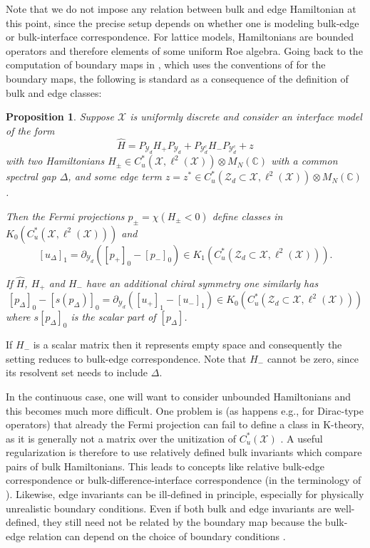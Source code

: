\documentclass[12pt]{amsart}
\newtheorem{proposition}[theorem]{Proposition}
\newcommand{\CM}{{\mathbb C}}
\newcommand{\Xx}{{\mathcal X}}
\newcommand{\Yy}{{\mathcal Y}}
\newcommand{\Zz}{{\mathcal Z}}
\newcommand{\pdv}{\partial}
\begin{document}
Note that we do not impose any relation between bulk and edge Hamiltonian at this point, since the precise setup depends on whether one is modeling bulk-edge or bulk-interface correspondence.
For lattice models, Hamiltonians are bounded operators and therefore elements of some uniform Roe algebra. Going back to the computation of boundary maps in \cite{ProdanSchulzBaldes2016}, which uses the conventions of \cite{RordamLarsenLaustsen2000} for the boundary maps, the following is standard as a consequence of the definition of bulk and edge classes:
\begin{proposition}
\label{prop:boundary_maps}
Suppose $\Xx$ is uniformly discrete and consider an interface model of the form
$$\hat{H}= P_{\Yy_d} H_+ P_{\Yy_d}  +  P_{\Yy^c_d} H_- P_{\Yy^c_d} + z$$
with two Hamiltonians $H_\pm \in C^*_u(\Xx,\ell^2(\Xx))\otimes M_N(\CM)$ with a common spectral gap $\Delta$, and some edge term $z=z^*\in C^*_u(\Zz_d\subset \Xx, \ell^2(\Xx))\otimes M_N(\CM)$.

Then the Fermi projections $p_\pm = \chi(H_\pm<0)$ define classes in $K_0(C^*_u(\Xx,\ell^2(\Xx)))$ and 
$$[u_\Delta]_1 = \pdv_{\Yy_d} \left( [p_+]_0- [p_-]_0\right) \in K_1(C^*_u(\Zz_d\subset \Xx, \ell^2(\Xx))).$$

If $\hat{H}$, $H_+$ and $H_-$ have an additional chiral symmetry one similarly has
\[[p_\Delta]_0-[s(p_\Delta)]_0 = \pdv_{\Yy_d} \left( [u_+]_1- [u_-]_1\right) \in K_0(C^*_u(\Zz_d\subset \Xx, \ell^2(\Xx)))\]
where $s[p_{\Delta}]_0$ is the scalar part of $[p_{\Delta}]$.
\end{proposition}
If $H_-$ is a scalar matrix then it represents empty space and consequently the setting reduces to bulk-edge correspondence. Note that $H_-$ cannot be zero, since its resolvent set needs to include $\Delta$. 

In the continuous case, one will want to consider unbounded Hamiltonians and this becomes much more difficult. One problem is (as happens e.g., for Dirac-type operators) that already the Fermi projection can fail to define a class in K-theory, as it is generally not a matrix over the unitization of $C^*_u(\Xx)$ \cite{KSt}. A useful regularization is therefore to use relatively defined bulk invariants which compare pairs of bulk Hamiltonians. This leads to concepts like relative bulk-edge correspondence \cite{KSt} or bulk-difference-interface correspondence (in the terminology of \cite{Bal2022TopologicalInvariants}). Likewise, edge invariants can be ill-defined in principle, especially for physically unrealistic boundary conditions. Even if both bulk and edge invariants are well-defined, they still need not be related by the boundary map because the bulk-edge relation can depend on the choice of boundary conditions \cite{KSt,JudTauber2026,GrafTarantola2026}.
\end{document}
